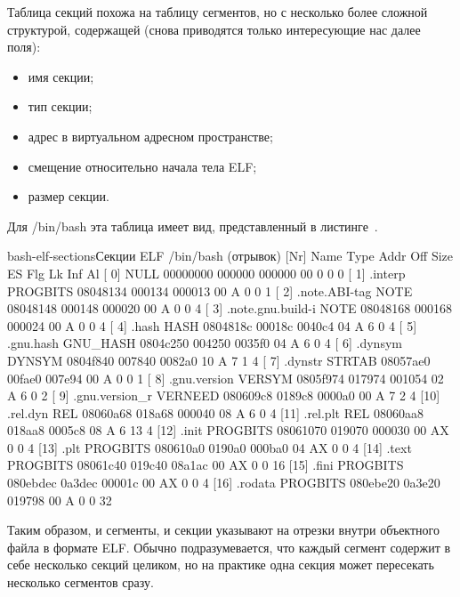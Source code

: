 Таблица секций похожа на таблицу сегментов, но с несколько более сложной структурой, содержащей (снова приводятся только интересующие нас далее поля):
\begin{itemize}
    \item имя секции;
    \item тип секции;
    \item адрес в виртуальном адресном пространстве;
    \item смещение относительно начала тела ELF;
    \item размер секции.
\end{itemize}

Для /bin/bash эта таблица имеет вид, представленный в листинге~.
\begin{stdout}{bash-elf-sections}{Секции ELF /bin/bash (отрывок)}
[Nr] Name              Type            Addr     Off    Size   ES Flg Lk Inf Al
[ 0]                   NULL            00000000 000000 000000 00      0   0  0
[ 1] .interp           PROGBITS        08048134 000134 000013 00   A  0   0  1
[ 2] .note.ABI-tag     NOTE            08048148 000148 000020 00   A  0   0  4
[ 3] .note.gnu.build-i NOTE            08048168 000168 000024 00   A  0   0  4
[ 4] .hash             HASH            0804818c 00018c 0040c4 04   A  6   0  4
[ 5] .gnu.hash         GNU_HASH        0804c250 004250 0035f0 04   A  6   0  4
[ 6] .dynsym           DYNSYM          0804f840 007840 0082a0 10   A  7   1  4
[ 7] .dynstr           STRTAB          08057ae0 00fae0 007e94 00   A  0   0  1
[ 8] .gnu.version      VERSYM          0805f974 017974 001054 02   A  6   0  2
[ 9] .gnu.version_r    VERNEED         080609c8 0189c8 0000a0 00   A  7   2  4
[10] .rel.dyn          REL             08060a68 018a68 000040 08   A  6   0  4
[11] .rel.plt          REL             08060aa8 018aa8 0005c8 08   A  6  13  4
[12] .init             PROGBITS        08061070 019070 000030 00  AX  0   0  4
[13] .plt              PROGBITS        080610a0 0190a0 000ba0 04  AX  0   0  4
[14] .text             PROGBITS        08061c40 019c40 08a1ac 00  AX  0   0 16
[15] .fini             PROGBITS        080ebdec 0a3dec 00001c 00  AX  0   0  4
[16] .rodata           PROGBITS        080ebe20 0a3e20 019798 00   A  0   0 32
\end{stdout}

Таким образом, и сегменты, и секции указывают на отрезки внутри объектного файла в формате ELF.
Обычно подразумевается, что каждый сегмент содержит в себе несколько секций целиком, но на практике одна секция может пересекать несколько сегментов сразу.

